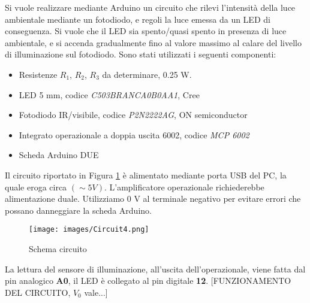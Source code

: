 Si vuole realizzare mediante Arduino un circuito che rilevi l’intensità della luce ambientale mediante un fotodiodo, e regoli la luce emessa da un LED di conseguenza. Si vuole che il LED sia spento/quasi spento in presenza di luce ambientale, e si accenda gradualmente fino al valore massimo al calare del livello di illuminazione sul fotodiodo. Sono stati utilizzati i seguenti componenti:
\begin{itemize}
    \item Resistenze $R_1$, $R_2$, $R_3$ da determinare, 0.25 W.
    \item LED 5 mm,  codice \textit{C503BRANCA0B0AA1}, Cree 
    \item Fotodiodo IR/visibile, codice \textit{P2N2222AG}, ON semiconductor
    \item Integrato operazionale a doppia uscita 6002, codice \textit{MCP 6002}
    \item Scheda Arduino DUE
\end{itemize}
Il circuito riportato in Figura \ref{fig:Circuit4} è alimentato mediante porta USB del PC, la quale eroga circa $(\sim 5 V)$. L'amplificatore operazionale richiederebbe alimentazione duale. Utilizziamo 0 V al terminale negativo per evitare errori che possano danneggiare la scheda Arduino.
\begin{figure}[H]
    \centering
    \texttt{[image: images/Circuit4.png]}
    \caption{Schema circuito}
    \label{fig:Circuit4}
\end{figure}
La lettura del sensore di illuminazione, all'uscita dell'operazionale, viene fatta dal pin analogico \textbf{A0}, il LED è collegato al pin digitale \textbf{12}.
[FUNZIONAMENTO DEL CIRCUITO, $V_0$ vale...]
\clearpage
